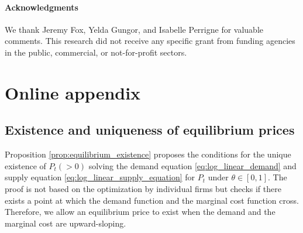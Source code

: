 \documentclass[11pt, a4paper]{article}
\begin{document}
\paragraph{Acknowledgments}
We thank Jeremy Fox, Yelda Gungor, and Isabelle Perrigne for valuable comments. This research did not receive any specific grant from funding agencies in the public, commercial, or not-for-profit sectors. 

\newpage



\newpage
\appendix

\section{Online appendix}
\subsection{Existence and uniqueness of equilibrium prices}\label{sec:appendix_proof}

Proposition \ref{prop:equilibrium_existence} proposes the conditions for the unique existence of $P_{t}(>0)$ solving the demand equation \eqref{eq:log_linear_demand} and supply equation \eqref{eq:log_linear_supply_equation} for $P_{t}$ under $\theta\in[0,1]$.
The proof is not based on the optimization by individual firms but checks if there exists a point at which the demand function and the marginal cost function cross.
Therefore, we allow an equilibrium price to exist when the demand and the marginal cost are upward-sloping.
    
\end{document}
